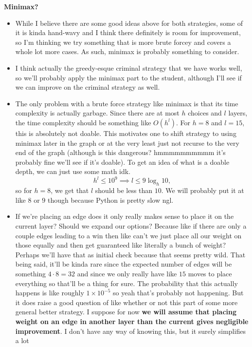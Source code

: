 \documentclass[a4paper, 12pt]{article}
\begin{document}
\textbf{Minimax?}
\begin{itemize}
    \item While I believe there are some good ideas above for both strategies, some of it is kinda hand-wavy and I think there definitely is room for improvement, so I'm thinking we try something that is more brute forcey and covers a whole lot more cases. As such, minimax is probably something to consider.
    \item I think actually the greedy-esque criminal strategy that we have works well, so we'll probably apply the minimax part to the student, although I'll see if we can improve on the criminal strategy as well.
    \item The only problem with a brute force strategy like minimax is that its time complexity is actually garbage. Since there are at most \( h \) choices and \( l \) layers, the time complexity should be something like \( O(h^l) \). For \( h = 8 \) and \( l = 15 \), this is absolutely not doable. This motivates one to shift strategy to using minimax later in the graph or at the very least just not recurse to the very end of the graph (although is this dangerous? hmmmmmmmmmm it's probably fine we'll see if it's doable). To get an idea of what is a doable depth, we can just use some math idk.
        \[
            h^l \le 10^9 \implies l \le 9\log_h{10}
        ,\]
        so for \( h = 8 \), we get that \( l \) should be less than \( 10 \). We will probably put it at like \( 8 \) or \( 9 \) though because Python is pretty slow ngl.

    \item If we're placing an edge does it only really makes sense to place it on the current layer? Should we expand our options? Because like if there are only a couple edges leading to a win then like can't we just place all our weight on those equally and then get guaranteed like literally a bunch of weight? Perhaps we'll have that as initial check because that seems pretty wild. That being said, it'll be kinda rare since the expected number of edges will be something \( 4 \cdot 8 = 32 \) and since we only really have like \( 15 \) moves to place everything so that'll be a thing for sure. The probability that this actually happens is like roughly \( 1 \times 10^{-5} \) so yeah that's probably not happening. But it does raise a good question of like whether or not this part of some more general better strategy. I suppose for now \textbf{we will assume that placing weight on an edge in another layer than the current gives negligible improvement}. I don't have any way of knowing this, but it surely simplifies a lot


\end{itemize}
\end{document}
